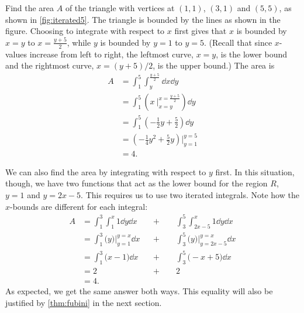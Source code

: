\begin{example}\label{ex_iterated5}
Find the area $A$ of the triangle with vertices at $(1,1)$, $(3,1)$ and $(5,5)$, as shown in \autoref{fig:iterated5}.
%
\solution
The triangle is bounded by the lines as shown in the figure. Choosing to integrate with respect to $x$ first gives that $x$ is bounded by $x=y$ to $x = \frac{y+5}2$, while $y$ is bounded by $y=1$ to $y=5$. (Recall that since $x$-values increase from left to right, the leftmost curve, $x=y$, is the lower bound and the rightmost curve, $x=(y+5)/2$, is the upper bound.) The area is
\begin{align*}
A &= \int_1^5\int_{y}^{\frac{y+5}2}\dd x\dd y \\
 &= \int_1^5\left(x\ \Big|_{x=y}^{x=\frac{y+5}2}\right)\dd y \\
&= \int_1^5 \left(-\frac12y+\frac52\right)\dd y \\
&= \left(-\frac14y^2+\frac52y\right)\Big|_{y=1}^{y=5}\\
&=4.
\end{align*}

We can also find the area by integrating with respect to $y$ first. In this situation, though, we have two functions that act as the lower bound for the region $R$, $y=1$ and $y=2x-5$. This requires us to use two iterated integrals. Note how the $x$-bounds are different for each integral:
\begin{align*}
 A
 &= \int_1^3\int_1^x 1\dd y \dd x &&+\qquad\int_3^5\int_{2x-5}^x1\dd y\dd x\\
 &= \int_1^3\bigl(y\bigr)\Big|_{y=1}^{y=x}\dd x &&+\qquad\int_3^5\bigl(y\bigr)\Big|_{y=2x-5}^{y=x}\dd x\\
 &= \int_1^3\bigl(x-1\bigr)\dd x &&+\qquad\int_3^5\bigl(-x+5\bigr)\dd x \\
 &= 2 &&+\qquad2 \\
 &=4.
\end{align*}
As expected, we get the same answer both ways.  This equality will also be justified by \autoref{thm:fubini} in the next section.
\end{example}

